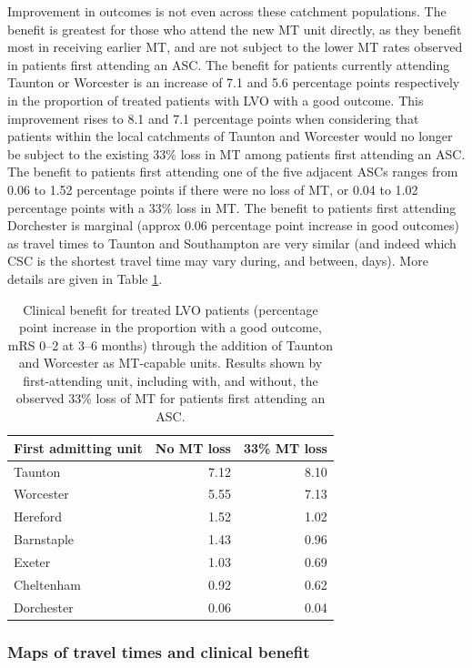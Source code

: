 Improvement in outcomes is not even across these catchment populations. The benefit is greatest for those who attend the new MT unit directly, as they benefit most in receiving earlier MT, and are not subject to the lower MT rates observed in patients first attending an ASC. The benefit for patients currently attending Taunton or Worcester is an increase of 7.1 and 5.6 percentage points respectively in the proportion of treated patients with LVO with a good outcome. This improvement rises to 8.1 and 7.1 percentage points when considering that patients within the local catchments of Taunton and Worcester would no longer be subject to the existing 33\% loss in MT among patients first attending an ASC. The benefit to patients first attending one of the five adjacent ASCs ranges from 0.06 to 1.52 percentage points if there were no loss of MT, or 0.04 to 1.02 percentage points with a 33\% loss in MT. The benefit to patients first attending Dorchester is marginal (approx 0.06 percentage point increase in good outcomes) as travel times to Taunton and Southampton are very similar (and indeed which CSC is the shortest travel time may vary during, and between, days). More details are given in Table \ref{tab:ivt-location}.

\begin{table}[H]
  \centering
  \caption{Clinical benefit for treated LVO patients (percentage point increase in the proportion with a good outcome, mRS 0--2 at 3--6 months) through the addition of Taunton and Worcester as MT-capable units. Results shown by first-attending unit, including with, and without, the observed 33\% loss of MT for patients first attending an ASC.} 
  \label{tab:ivt-location}
  \begin{tabular}{lrr}
    \toprule
    First admitting unit & No MT loss & 33\% MT loss \\
    \midrule
    Taunton & 7.12 & 8.10 \\
    Worcester & 5.55 & 7.13 \\
    Hereford & 1.52 & 1.02 \\
    Barnstaple & 1.43 & 0.96 \\
    Exeter & 1.03 & 0.69 \\
    Cheltenham & 0.92 & 0.62 \\
    Dorchester & 0.06 & 0.04 \\
    \bottomrule
  \end{tabular}
\end{table}

\subsubsection{Maps of travel times and clinical benefit}

